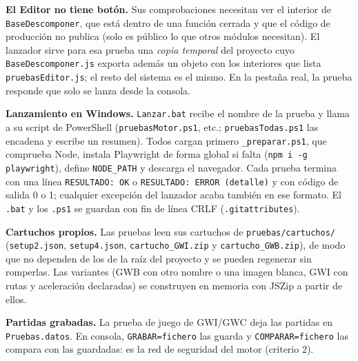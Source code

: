 \textbf{El Editor no tiene botón.} Sus comprobaciones necesitan ver el interior de \texttt{BaseDescomponer}, que está dentro de una función cerrada y que el código de producción no publica (solo es público lo que otros módulos necesitan). El lanzador sirve para esa prueba una \emph{copia temporal} del proyecto cuyo \texttt{BaseDescomponer.js} exporta además un objeto con los interiores que lista \texttt{pruebasEditor.js}; el resto del sistema es el mismo. En la pestaña real, la prueba responde que solo se lanza desde la consola.

\textbf{Lanzamiento en Windows.} \texttt{Lanzar.bat} recibe el nombre de la prueba y llama a su script de PowerShell (\texttt{pruebasMotor.ps1}, etc.; \texttt{pruebasTodas.ps1} las encadena y escribe un resumen). Todos cargan primero \texttt{\_preparar.ps1}, que comprueba Node, instala Playwright de forma global si falta (\texttt{npm i -g playwright}), define \texttt{NODE\_PATH} y descarga el navegador. Cada prueba termina con una línea \texttt{RESULTADO: OK} o \texttt{RESULTADO: ERROR (detalle)} y con código de salida 0 o 1; cualquier excepción del lanzador acaba también en ese formato. El \texttt{.bat} y los \texttt{.ps1} se guardan con fin de línea CRLF (\texttt{.gitattributes}).

\textbf{Cartuchos propios.} Las pruebas leen sus cartuchos de \texttt{pruebas/cartuchos/} (\texttt{setup2.json}, \texttt{setup4.json}, \texttt{cartucho\_GWI.zip} y \texttt{cartucho\_GWB.zip}), de modo que no dependen de los de la raíz del proyecto y se pueden regenerar sin romperlas. Las variantes (GWB con otro nombre o una imagen blanca, GWI con rutas y aceleración declaradas) se construyen en memoria con JSZip a partir de ellos.

\textbf{Partidas grabadas.} La prueba de juego de GWI/GWC deja las partidas en \texttt{Pruebas.datos}. En consola, \texttt{GRABAR=fichero} las guarda y \texttt{COMPARAR=fichero} las compara con las guardadas: es la red de seguridad del motor (criterio 2).

